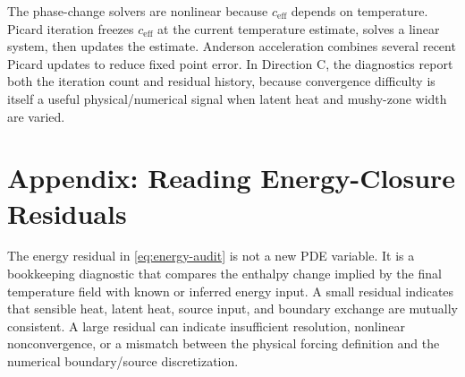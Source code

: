 \documentclass[11pt]{article}
\numberwithin{equation}{section}
\begin{document}
The phase-change solvers are nonlinear because $c_{\mathrm{eff}}$ depends on
temperature.  Picard iteration freezes $c_{\mathrm{eff}}$ at the current
temperature estimate, solves a linear system, then updates the estimate.
Anderson acceleration combines several recent Picard updates to reduce fixed
point error.  In Direction C, the diagnostics report both the iteration count
and residual history, because convergence difficulty is itself a useful
physical/numerical signal when latent heat and mushy-zone width are varied.

\section{Appendix: Reading Energy-Closure Residuals}

The energy residual in \eqref{eq:energy-audit} is not a new PDE variable.  It is
a bookkeeping diagnostic that compares the enthalpy change implied by the final
temperature field with known or inferred energy input.  A small residual
indicates that sensible heat, latent heat, source input, and boundary exchange
are mutually consistent.  A large residual can indicate insufficient
resolution, nonlinear nonconvergence, or a mismatch between the physical
forcing definition and the numerical boundary/source discretization.
\end{document}
